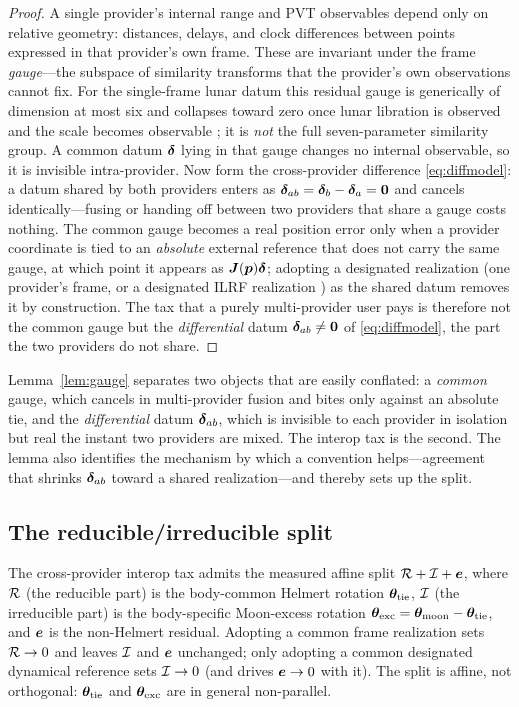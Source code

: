 \begin{proof}
A single provider's internal range and PVT observables depend only on relative
geometry: distances, delays, and clock differences between points expressed in that
provider's own frame. These are invariant under the frame \emph{gauge}---the subspace
of similarity transforms that the provider's own observations cannot fix. For the
single-frame lunar datum this residual gauge is generically of dimension at most six
and collapses toward zero once lunar libration is observed and the scale becomes
observable \citep{baweja2026datum}; it is \emph{not} the full seven-parameter
similarity group. A common datum $\bm{\delta}$ lying in that gauge changes no internal
observable, so it is invisible intra-provider. Now form the cross-provider difference
\eqref{eq:diffmodel}: a datum shared by both providers enters as
$\bm{\delta}_{ab}=\bm{\delta}_b-\bm{\delta}_a=\bm 0$ and cancels identically---fusing or handing off
between two providers that share a gauge costs nothing. The common gauge becomes a
real position error only when a provider coordinate is tied to an \emph{absolute}
external reference that does not carry the same gauge, at which point it appears as
$\bm{J}(\bm{p})\bm{\delta}$; adopting a designated realization (one provider's frame, or a
designated ILRF realization \citep{sosnica2025ilrf,altamimi2016itrf2014}) as the
shared datum removes it by construction. The tax that a purely multi-provider user
pays is therefore not the common gauge but the \emph{differential} datum
$\bm{\delta}_{ab}\neq\bm 0$ of \eqref{eq:diffmodel}, the part the two providers do not
share.
\end{proof}

\noindent Lemma~\ref{lem:gauge} separates two objects that are easily conflated: a
\emph{common} gauge, which cancels in multi-provider fusion and bites only against an
absolute tie, and the \emph{differential} datum $\bm{\delta}_{ab}$, which is invisible to
each provider in isolation but real the instant two providers are mixed. The interop
tax is the second. The lemma also identifies the mechanism by which a convention
helps---agreement that shrinks $\bm{\delta}_{ab}$ toward a shared realization---and thereby
sets up the split.

\subsection{The reducible/irreducible split}

\begin{lemma}
\label{lem:split}
The cross-provider interop tax admits the measured affine split
$\mathcal{R} + \mathcal{I} + \bm{e}$, where $\mathcal{R}$ (the reducible part) is the body-common
Helmert rotation $\bm{\theta}_{\mathrm{tie}}$, $\mathcal{I}$ (the irreducible part) is the
body-specific Moon-excess rotation
$\bm{\theta}_{\mathrm{exc}}=\bm{\theta}_{\mathrm{moon}}-\bm{\theta}_{\mathrm{tie}}$, and $\bm{e}$ is the
non-Helmert residual. Adopting a common frame realization sets $\mathcal{R}\to0$ and
leaves $\mathcal{I}$ and $\bm{e}$ unchanged; only adopting a common designated dynamical
reference sets $\mathcal{I}\to0$ (and drives $\bm{e}\to0$ with it). The split is affine, not
orthogonal: $\bm{\theta}_{\mathrm{tie}}$ and $\bm{\theta}_{\mathrm{exc}}$ are in general
non-parallel.
\end{lemma}

